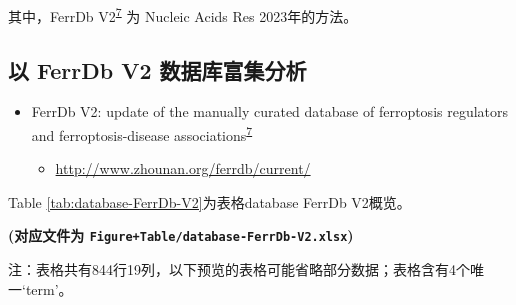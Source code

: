 \documentclass[
]{article}
\providecommand{\tightlist}{%
  \setlength{\itemsep}{0pt}\setlength{\parskip}{0pt}}
\begin{document}
其中，FerrDb V2\textsuperscript{\protect\hyperlink{ref-FerrdbV2UpdaZhou2023}{7}} 为 Nucleic Acids Res 2023年的方法。

\hypertarget{ux4ee5-ferrdb-v2-ux6570ux636eux5e93ux5bccux96c6ux5206ux6790}{%
\subsection{以 FerrDb V2 数据库富集分析}\label{ux4ee5-ferrdb-v2-ux6570ux636eux5e93ux5bccux96c6ux5206ux6790}}

\begin{itemize}
\tightlist
\item
  FerrDb V2: update of the manually curated database of ferroptosis regulators
  and ferroptosis-disease associations\textsuperscript{\protect\hyperlink{ref-FerrdbV2UpdaZhou2023}{7}}

  \begin{itemize}
  \tightlist
  \item
    \url{http://www.zhounan.org/ferrdb/current/}
  \end{itemize}
\end{itemize}

Table \ref{tab:database-FerrDb-V2}为表格database FerrDb V2概览。

\textbf{(对应文件为 \texttt{Figure+Table/database-FerrDb-V2.xlsx})}

\begin{center}\begin{tcolorbox}[colback=gray!10, colframe=gray!50, width=0.9\linewidth, arc=1mm, boxrule=0.5pt]注：表格共有844行19列，以下预览的表格可能省略部分数据；表格含有4个唯一`term'。
\end{tcolorbox}
\end{center}
\end{document}
